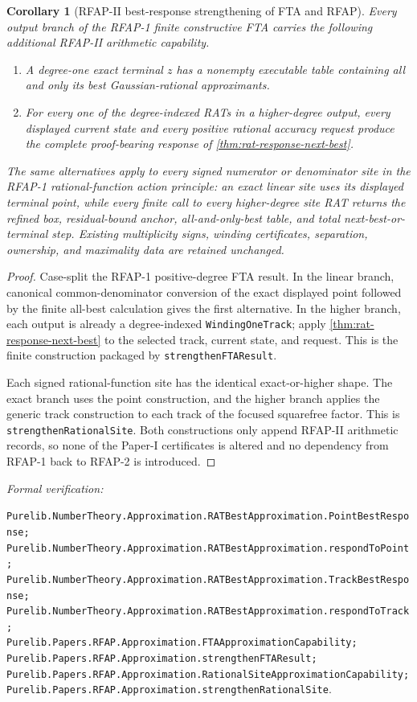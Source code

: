 \documentclass[11pt]{article}
\newtheorem{corollary}[corollary]{Corollary}
\newcommand{\leanref}[1]{\par\smallskip\noindent
  \emph{Formal verification:}\par\nobreak
  {\raggedright\nolinkurl{#1}.\par}}
\begin{document}
\begin{corollary}[RFAP-II best-response strengthening of FTA and RFAP]
\label{cor:fta-rfap-best-response}
Every output branch of the RFAP-1 finite constructive FTA carries the
following additional RFAP-II arithmetic capability.
\begin{enumerate}[label=(\roman*)]
\item A degree-one exact terminal $z$ has a nonempty executable table
      containing all and only its best Gaussian-rational approximants.
\item For every one of the degree-indexed RATs in a higher-degree output,
      every displayed current state and every positive rational accuracy
      request produce the complete proof-bearing response of
      \cref{thm:rat-response-next-best}.
\end{enumerate}
The same alternatives apply to every signed numerator or denominator site in
the RFAP-1 rational-function action principle: an exact linear site uses its
displayed terminal point, while every finite call to every higher-degree site
RAT returns the refined box, residual-bound anchor, all-and-only-best table,
and total next-best-or-terminal step.  Existing multiplicity signs, winding
certificates, separation, ownership, and maximality data are retained
unchanged.
\end{corollary}

\begin{proof}
Case-split the RFAP-1 positive-degree FTA result.  In the linear branch,
canonical common-denominator conversion of the exact displayed point followed
by the finite all-best calculation gives the first alternative.  In the
higher branch, each output is already a degree-indexed
\texttt{WindingOneTrack}; apply \cref{thm:rat-response-next-best} to the
selected track, current state, and request.  This is the finite construction
packaged by \texttt{strengthenFTAResult}.

Each signed rational-function site has the identical exact-or-higher shape.
The exact branch uses the point construction, and the higher branch applies
the generic track construction to each track of the focused squarefree
factor.  This is \texttt{strengthenRationalSite}.  Both constructions only
append RFAP-II arithmetic records, so none of the Paper-I certificates is
altered and no dependency from RFAP-1 back to RFAP-2 is introduced.
\end{proof}

\leanref{Purelib.NumberTheory.Approximation.RATBestApproximation.PointBestResponse;
Purelib.NumberTheory.Approximation.RATBestApproximation.respondToPoint;
Purelib.NumberTheory.Approximation.RATBestApproximation.TrackBestResponse;
Purelib.NumberTheory.Approximation.RATBestApproximation.respondToTrack;
Purelib.Papers.RFAP.Approximation.FTAApproximationCapability;
Purelib.Papers.RFAP.Approximation.strengthenFTAResult;
Purelib.Papers.RFAP.Approximation.RationalSiteApproximationCapability;
Purelib.Papers.RFAP.Approximation.strengthenRationalSite}
\end{document}
